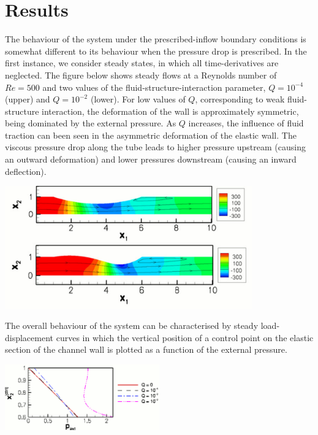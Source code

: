  

\hypertarget{index_reslt}{}\section{Results}\label{index_reslt}
The behaviour of the system under the prescribed-\/inflow boundary conditions is somewhat different to its behaviour when the pressure drop is prescribed. In the first instance, we consider steady states, in which all time-\/derivatives are neglected. The figure below shows steady flows at a Reynolds number of $ Re=500 $ and two values of the fluid-\/structure-\/interaction parameter, $ Q = 10^{-4} $ (upper) and $ Q = 10^{-2}$ (lower). For low values of $Q$, corresponding to weak fluid-\/structure interaction, the deformation of the wall is approximately symmetric, being dominated by the external pressure. As $Q$ increases, the influence of fluid traction can been seen in the asymmetric deformation of the elastic wall. The viscous pressure drop along the tube leads to higher pressure upstream (causing an outward deformation) and lower pressures downstream (causing an inward deflection).

 
\begin{DoxyImage}
\includegraphics[width=0.8\textwidth]{steady_flows}
\end{DoxyImage}


The overall behaviour of the system can be characterised by steady load-\/displacement curves in which the vertical position of a control point on the elastic section of the channel wall is plotted as a function of the external pressure.

 
\begin{DoxyImage}
\includegraphics[width=0.5\textwidth]{steady_trace}
\end{DoxyImage}


